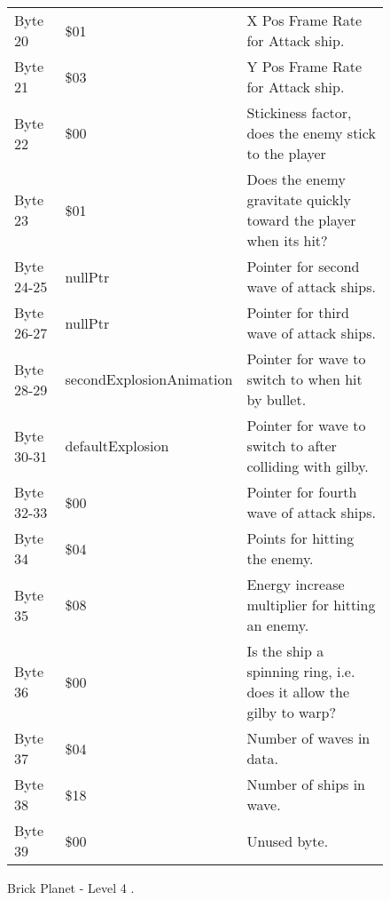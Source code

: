 \begin{figure}[H]
{\begin{adjustbox}{width=12cm}
\begin{tabular}{lll}
 Byte 20    & \$01                      & X Pos Frame Rate for Attack ship.                                   \\
 Byte 21    & \$03                      & Y Pos Frame Rate for Attack ship.                                   \\
 Byte 22    & \$00                      & Stickiness factor, does the enemy stick to the player               \\
 Byte 23    & \$01                      & Does the enemy gravitate quickly toward the player when its hit?    \\
 Byte 24-25 & nullPtr                  & Pointer for second wave of attack ships.                            \\
 Byte 26-27 & nullPtr                  & Pointer for third wave of attack ships.                             \\
 Byte 28-29 & secondExplosionAnimation & Pointer for wave to switch to when hit by bullet.                   \\
 Byte 30-31 & defaultExplosion         & Pointer for  wave to switch to after colliding with gilby.          \\
 Byte 32-33 & \$00                      & Pointer for fourth wave of attack ships.                            \\
 Byte 34    & \$04                      & Points for hitting the enemy.                                       \\
 Byte 35    & \$08                      & Energy increase multiplier for hitting an enemy.                    \\
 Byte 36    & \$00                      & Is the ship a spinning ring, i.e. does it allow the gilby to warp?  \\
 Byte 37    & \$04                      & Number of waves in data.                                            \\
 Byte 38    & \$18                      & Number of ships in wave.                                            \\
 Byte 39    & \$00                      & Unused byte.                                                        \\
\bottomrule
\end{tabular}

  \end{adjustbox}

  }\caption*{Brick Planet - Level 4
.}
\end{figure}

